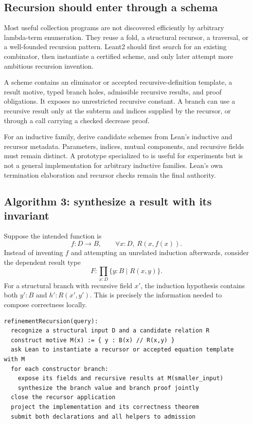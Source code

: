 \documentclass[11pt,letterpaper]{article}
\newcommand{\code}[1]{\texttt{\detokenize{#1}}}
\theoremstyle{definition}\newtheorem{definition}[theorem]{Definition}
\theoremstyle{remark}\newtheorem{remark}[theorem]{Remark}
\begin{document}
\subsection{Recursion should enter through a schema}

Most useful collection programs are not discovered efficiently by arbitrary
lambda-term enumeration. They reuse a fold, a structural recursor, a traversal,
or a well-founded recursion pattern. Leant2 should first search for an existing
combinator, then instantiate a certified scheme, and only later attempt more
ambitious recursion invention.

A scheme contains an eliminator or accepted recursive-definition template,
a result motive, typed branch holes, admissible recursive results, and proof
obligations. It exposes no unrestricted recursive constant. A branch can use a
recursive result only at the subterm and indices supplied by the recursor, or
through a call carrying a checked decrease proof.

For an inductive family, derive candidate schemes from Lean's inductive and
recursor metadata. Parameters, indices, mutual components, and recursive fields
must remain distinct. A prototype specialized to \code{List} is useful for
experiments but is not a general implementation for arbitrary inductive families.
Lean's own termination elaboration and recursor checks remain the final authority.
\cite{recursive}

\subsection{Algorithm 3: synthesize a result with its invariant}

Suppose the intended function is
\[
 f:D\to B,\qquad\forall x:D,\ R(x,f(x)).
\]
Instead of inventing $f$ and attempting an unrelated induction afterwards,
consider the dependent result type
\[
 F:\prod_{x:D}\{y:B\mid R(x,y)\}.
\]
For a structural branch with recursive field $x'$, the induction hypothesis
contains both $y':B$ and $h':R(x',y')$. This is precisely the information needed
to compose correctness locally.

\begin{lstlisting}[language={}]
refinementRecursion(query):
  recognize a structural input D and a candidate relation R
  construct motive M(x) := { y : B(x) // R(x,y) }
  ask Lean to instantiate a recursor or accepted equation template with M
  for each constructor branch:
    expose its fields and recursive results at M(smaller_input)
    synthesize the branch value and branch proof jointly
  close the recursor application
  project the implementation and its correctness theorem
  submit both declarations and all helpers to admission
\end{lstlisting}
\end{document}
